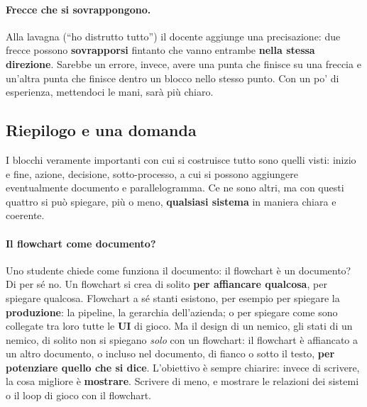 \paragraph{Frecce che si sovrappongono.} Alla lavagna (``ho distrutto tutto'')
il docente aggiunge una precisazione: due frecce possono
\textbf{sovrapporsi} fintanto che vanno entrambe \textbf{nella stessa
direzione}. Sarebbe un errore, invece, avere una punta che finisce su una
freccia e un'altra punta che finisce dentro un blocco nello stesso punto. Con
un po' di esperienza, mettendoci le mani, sarà più chiaro.

\subsection{Riepilogo e una domanda}

I blocchi veramente importanti con cui si costruisce tutto sono quelli
visti: inizio e fine, azione, decisione, sotto-processo, a cui si possono
aggiungere eventualmente documento e parallelogramma. Ce ne sono altri, ma
con questi quattro si può spiegare, più o meno, \textbf{qualsiasi sistema} in
maniera chiara e coerente.

\paragraph{Il flowchart come documento?} Uno studente chiede come funziona il
documento: il flowchart è un documento? Di per sé no. Un flowchart si crea di
solito \textbf{per affiancare qualcosa}, per spiegare qualcosa. Flowchart a
sé stanti esistono, per esempio per spiegare la \textbf{produzione}: la
pipeline, la gerarchia dell'azienda; o per spiegare come sono collegate tra
loro tutte le \textbf{UI} di gioco. Ma il design di un nemico, gli stati di
un nemico, di solito non si spiegano \emph{solo} con un flowchart: il
flowchart è affiancato a un altro documento, o incluso nel documento, di
fianco o sotto il testo, \textbf{per potenziare quello che si dice}.
L'obiettivo è sempre chiarire: invece di scrivere, la cosa migliore è
\textbf{mostrare}. Scrivere di meno, e mostrare le relazioni dei sistemi o il
loop di gioco con il flowchart.

